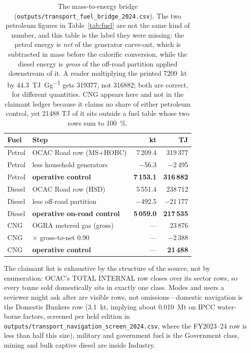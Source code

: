 \begin{table}[htbp]
\centering
\footnotesize
\begin{tabular}{@{}llrr@{}}
\toprule
\textbf{Fuel} & \textbf{Step} & \textbf{kt} & \textbf{TJ} \\
\midrule
Petrol & OCAC Road row (MS+HOBC)   & 7\,209.4 & 319\,377 \\
Petrol & less household generators & $-$56.3  & $-$2\,495 \\
Petrol & \textbf{operative control} & \textbf{7\,153.1} & \textbf{316\,882} \\
\midrule
Diesel & OCAC Road row (HSD)       & 5\,551.4 & 238\,712 \\
Diesel & less off-road partition   & $-$492.5 & $-$21\,177 \\
Diesel & \textbf{operative on-road control} & \textbf{5\,059.0} & \textbf{217\,535} \\
\midrule
CNG    & OGRA metered gas (gross)  & ---      & 23\,876 \\
CNG    & $\times$ gross-to-net 0.90 & ---     & $-$2\,388 \\
CNG    & \textbf{operative control} & ---     & \textbf{21\,488} \\
\bottomrule
\end{tabular}
\caption{The mass-to-energy bridge
(\texttt{outputs/transport\_fuel\_bridge\_2024.csv}). The two petroleum figures in
Table~\ref{tab:fuel} are not the same kind of number, and this table is the label they
were missing: the petrol energy is \emph{net} of the generator carve-out, which is
subtracted in mass before the calorific conversion, while the diesel energy is
\emph{gross} of the off-road partition applied downstream of it. A reader multiplying
the printed \SI{7209}{\kilo\tonne} by \SI{44.3}{\tera\joule\per\giga\gram} gets
\num{319377}, not \num{316882}; both are correct, for different quantities. CNG appears
here and not in the claimant ledger because it claims no share of either petroleum
control, yet \num{21488} TJ of it sits outside a fuel table whose two rows sum to
\SI{100}{\percent}.}
\label{tab:fuelbridge}
\end{table}

The claimant list is exhaustive by the structure of the source, not by enumeration:
OCAC's TOTAL INTERNAL row closes over its sector rows, so every tonne sold domestically
sits in exactly one class. Modes and users a reviewer might ask after are visible rows,
not omissions---domestic navigation is the Domestic Bunkers row (\SI{3.1}{\kilo\tonne},
implying about \SI{0.010}{\mega\tonne} \COe{} on IPCC water-borne factors, screened per
held edition in \texttt{outputs/transport\_navigation\_screen\_2024.csv}, where the
FY2023--24 row is less than half this size), military and government fuel is the
Government class, mining and bulk
captive diesel are inside Industry.

